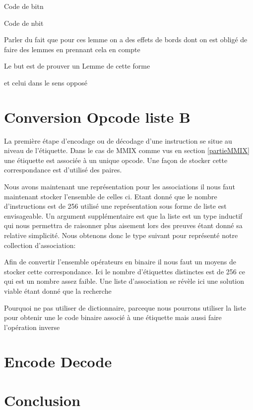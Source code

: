 \documentclass {article}
\newcommand{\codefrom}[3]
           {}
\theoremstyle{definition}
\theoremstyle{remark}
\begin{document}
Code de bitn
\codefrom{src}{binary}{bitn}

Code de nbit
\codefrom{src}{binary}{nbit}


Parler du fait que pour ces lemme on a des effets de bords dont on est obligé
de faire des lemmes en prennant cela en compte 

Le but est de prouver un Lemme de cette forme
\codefrom{src}{binary}{nbitn}

et celui dans le sens opposé 
\codefrom{src}{binary}{bitnbit}






\section{Conversion Opcode liste B}
\label{partieOpcode}

La première étape d'encodage ou de décodage d'une instruction se situe
au niveau de l'étiquette. Dans le cas de MMIX comme vus en section \ref{partieMMIX}
une étiquette est associée à un unique opcode. Une façon de stocker cette
correspondance est d'utilisé des paires.
\codefrom{src}{association_list}{assoc}

Nous avons maintenant une représentation pour les associations il nous faut
maintenant stocker l'ensemble de celles ci. Etant donné que le nombre
d'instructions est de 256 utilisé une représentation sous forme
de liste est envisageable. Un argument supplémentaire est que la liste
est un type inductif qui nous permettra de raisonner plus aisement
lors des preuves étant donné sa relative simplicité.
Nous obtenons donc le type suivant pour représenté notre collection d'association:

\codefrom{src}{association_list}{tag_opcode_assoc}


\remark{}





Afin de convertir l'ensemble opérateurs en binaire il nous faut
un moyens de stocker cette correspondance.
Ici le nombre d'étiquettes distinctes est de 256 ce qui est un nombre
assez faible. Une liste d'association se révèle ici une solution viable
étant donné que la recherche



Pourquoi ne pas utiliser de dictionnaire, parceque nous pourrons utiliser
la liste pour obtenir une le code binaire associé à une étiquette mais aussi faire
l'opération inverse


\section{Encode Decode}

\section{Conclusion}
\end{document}
